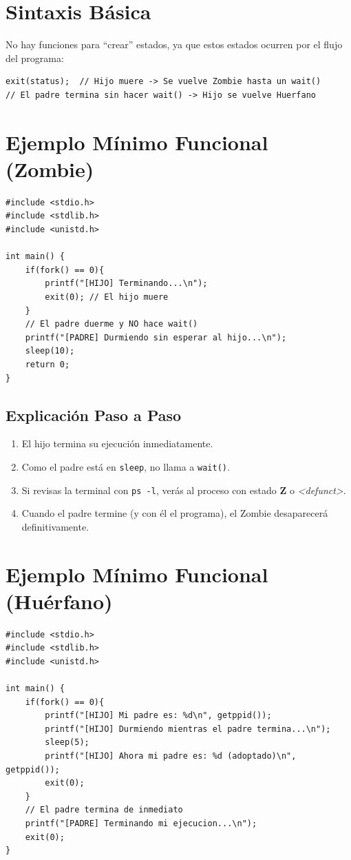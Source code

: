 \documentclass[12pt,a4paper]{article}
\begin{document}
\section{Sintaxis Básica}
No hay funciones para ``crear'' estados, ya que estos estados ocurren por el flujo del programa:
\begin{lstlisting}[numbers=none]
exit(status);  // Hijo muere -> Se vuelve Zombie hasta un wait()
// El padre termina sin hacer wait() -> Hijo se vuelve Huerfano
\end{lstlisting}

\section{Ejemplo Mínimo Funcional (Zombie)}
\begin{lstlisting}
#include <stdio.h>
#include <stdlib.h>
#include <unistd.h>

int main() {
    if(fork() == 0){
        printf("[HIJO] Terminando...\n");
        exit(0); // El hijo muere
    }
    // El padre duerme y NO hace wait()
    printf("[PADRE] Durmiendo sin esperar al hijo...\n");
    sleep(10); 
    return 0;
}
\end{lstlisting}

\subsection{Explicación Paso a Paso}
\begin{enumerate}
    \item El hijo termina su ejecución inmediatamente.
    \item Como el padre está en \texttt{sleep}, no llama a \texttt{wait()}.
    \item Si revisas la terminal con \texttt{ps -l}, verás al proceso con estado \textbf{Z} o \textit{<defunct>}.
    \item Cuando el padre termine (y con él el programa), el Zombie desaparecerá definitivamente.
\end{enumerate}

\section{Ejemplo Mínimo Funcional (Huérfano)}
\begin{lstlisting}
#include <stdio.h>
#include <stdlib.h>
#include <unistd.h>

int main() {
    if(fork() == 0){
        printf("[HIJO] Mi padre es: %d\n", getppid());
        printf("[HIJO] Durmiendo mientras el padre termina...\n");
        sleep(5);
        printf("[HIJO] Ahora mi padre es: %d (adoptado)\n", getppid());
        exit(0);
    }
    // El padre termina de inmediato
    printf("[PADRE] Terminando mi ejecucion...\n");
    exit(0);
}
\end{lstlisting}
\end{document}

